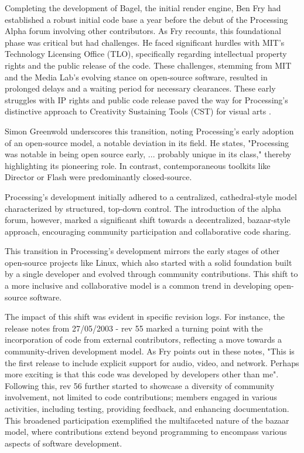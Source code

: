 


Completing the development of Bagel, the initial render engine, Ben Fry had established a robust initial code base a year before the debut of the Processing Alpha forum involving other contributors. As Fry recounts, this foundational phase was critical but had challenges. He faced significant hurdles with MIT's Technology Licensing Office (TLO), specifically regarding intellectual property rights and the public release of the code. These challenges, stemming from MIT and the Media Lab's evolving stance on open-source software, resulted in prolonged delays and a waiting period for necessary clearances. These early struggles with IP rights and public code release paved the way for Processing's distinctive approach to Creativity Sustaining Tools (CST) for visual arts \parencite{shneidermanCreativitySupportTools2002}.

Simon Greenwold underscores this transition, noting Processing's early adoption of an open-source model, a notable deviation in its field. He states, "Processing was notable in being open source early, ... probably unique in its class," thereby highlighting its pioneering role. In contrast, contemporaneous toolkits like Director or Flash were predominantly closed-source.

Processing's development initially adhered to a centralized, cathedral-style model characterized by structured, top-down control. The introduction of the alpha forum, however, marked a significant shift towards a decentralized, bazaar-style approach, encouraging community participation and collaborative code sharing.

This transition in Processing's development mirrors the early stages of other open-source projects like Linux, which also started with a solid foundation built by a single developer and evolved through community contributions. This shift to a more inclusive and collaborative model is a common trend in developing open-source software.

The impact of this shift was evident in specific revision logs. For instance, the release notes from 27/05/2003 - rev 55 marked a turning point with the incorporation of code from external contributors, reflecting a move towards a community-driven development model. As Fry points out in these notes, "This is the first release to include explicit support for audio, video, and network. Perhaps more exciting is that this code was developed by developers other than me". Following this, rev 56 further started to showcase a diversity of community involvement, not limited to code contributions; members engaged in various activities, including testing, providing feedback, and enhancing documentation. This broadened participation exemplified the multifaceted nature of the bazaar model, where contributions extend beyond programming to encompass various aspects of software development.

